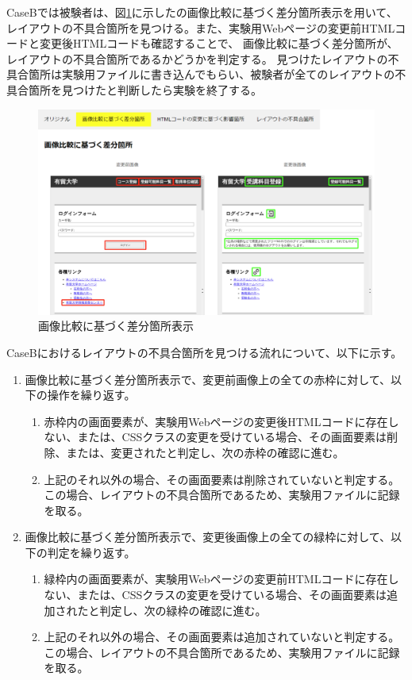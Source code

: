 CaseBでは被験者は、図\ref{fig:test1_img}に示した\toolName の画像比較に基づく差分箇所表示を用いて、
レイアウトの不具合箇所を見つける。また、実験用Webページの変更前HTMLコードと変更後HTMLコードも確認することで、
画像比較に基づく差分箇所が、レイアウトの不具合箇所であるかどうかを判定する。
見つけたレイアウトの不具合箇所は実験用ファイルに書き込んでもらい、被験者が全てのレイアウトの不具合箇所を見つけたと判断したら実験を終了する。
\begin{figure}[tp]
    \centering
    \includegraphics[width=1.0\textwidth]{image/5/5_app2.png}
    \caption{画像比較に基づく差分箇所表示}
    \label{fig:test1_img}
\end{figure}
CaseBにおけるレイアウトの不具合箇所を見つける流れについて、以下に示す。
\begin{enumerate}
    \item 画像比較に基づく差分箇所表示で、変更前画像上の全ての赤枠に対して、以下の操作を繰り返す。
          \begin{enumerate}
              \item 赤枠内の画面要素が、実験用Webページの変更後HTMLコードに存在しない、または、CSSクラスの変更を受けている場合、その画面要素は削除、または、変更されたと判定し、次の赤枠の確認に進む。
              \item 上記のそれ以外の場合、その画面要素は削除されていないと判定する。この場合、レイアウトの不具合箇所であるため、実験用ファイルに記録を取る。
          \end{enumerate}
    \item 画像比較に基づく差分箇所表示で、変更後画像上の全ての緑枠に対して、以下の判定を繰り返す。
          \begin{enumerate}
              \item 緑枠内の画面要素が、実験用Webページの変更前HTMLコードに存在しない、または、CSSクラスの変更を受けている場合、その画面要素は追加されたと判定し、次の緑枠の確認に進む。
              \item 上記のそれ以外の場合、その画面要素は追加されていないと判定する。この場合、レイアウトの不具合箇所であるため、実験用ファイルに記録を取る。
          \end{enumerate}
\end{enumerate}


